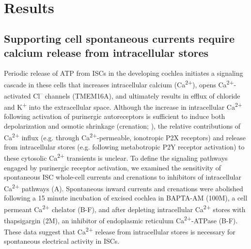 \documentclass[9pt,lineno]{elife}
\begin{document}
\section{Results}

\subsection{Supporting cell spontaneous currents require calcium release from intracellular stores}
Periodic release of ATP from ISCs in the developing cochlea initiates a signaling cascade in these cells that increases intracellular calcium (Ca\textsuperscript{2+}), opens Ca\textsuperscript{2+}-activated Cl\textsuperscript{–} channels (TMEM16A), and ultimately results in efflux of chloride and K\textsuperscript{+} into the extracellular space. Although the increase in intracellular Ca\textsuperscript{2+} following activation of purinergic autoreceptors is sufficient to induce both depolarization and osmotic shrinkage (crenation; \cite{Wang2015}), the relative contributions of Ca\textsuperscript{2+} influx (e.g. through Ca\textsuperscript{2+}-permeable, ionotropic P2X receptors) and release from intracellular stores (e.g. following metabotropic P2Y receptor activation) to these cytosolic Ca\textsuperscript{2+} transients is unclear. To define the signaling pathways engaged by purinergic receptor activation, we examined the sensitivity of spontaneous ISC whole-cell currents and crenations to inhibitors of intracellular Ca\textsuperscript{2+} pathways (A). Spontaneous inward currents and crenations were abolished following a 15 minute incubation of excised cochlea in BAPTA-AM (100\textmu M), a cell permeant Ca\textsuperscript{2+} chelator (B-F), and after depleting intracellular Ca\textsuperscript{2+} stores with thapsigargin (2\textmu M), an inhibitor of endoplasmic reticulum Ca\textsuperscript{2+}-ATPase (B-F). These data suggest that Ca\textsuperscript{2+} release from intracellular stores is necessary for spontaneous electrical activity in ISCs. 
\end{document}
